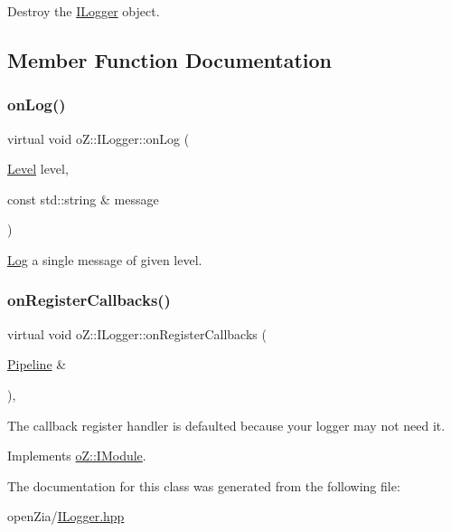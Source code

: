 Destroy the \mbox{\hyperlink{classo_z_1_1_i_logger}{I\+Logger}} object. 



\subsection{Member Function Documentation}
\mbox{\label{classo_z_1_1_i_logger_a2e0e168c9218055e41bdd5b57177cba1}} 
\subsubsection{\texorpdfstring{onLog()}{onLog()}}
{\footnotesize\ttfamily virtual void o\+Z\+::\+I\+Logger\+::on\+Log (\begin{DoxyParamCaption}\item[{\mbox{\hyperlink{namespaceo_z_a72fc7662d5f07391ac6f0a5699014bfa}{Level}}}]{level,  }\item[{const std\+::string \&}]{message }\end{DoxyParamCaption})\hspace{0.3cm}{\ttfamily [pure virtual]}}



\mbox{\hyperlink{classo_z_1_1_log}{Log}} a single message of given level. 

\mbox{\label{classo_z_1_1_i_logger_a10732b6da6e8f085c6fe5fa154d361ef}} 
\subsubsection{\texorpdfstring{onRegisterCallbacks()}{onRegisterCallbacks()}}
{\footnotesize\ttfamily virtual void o\+Z\+::\+I\+Logger\+::on\+Register\+Callbacks (\begin{DoxyParamCaption}\item[{\mbox{\hyperlink{classo_z_1_1_pipeline}{Pipeline}} \&}]{ }\end{DoxyParamCaption})\hspace{0.3cm}{\ttfamily [inline]}, {\ttfamily [virtual]}}



The callback register handler is defaulted because your logger may not need it. 



Implements \mbox{\hyperlink{classo_z_1_1_i_module_a3dc905faa6df5e22eecc6ffbc923fd95}{o\+Z\+::\+I\+Module}}.



The documentation for this class was generated from the following file\+:\begin{DoxyCompactItemize}
\item 
open\+Zia/\mbox{\hyperlink{_i_logger_8hpp}{I\+Logger.\+hpp}}\end{DoxyCompactItemize}

